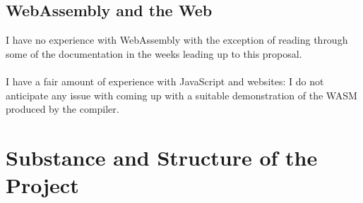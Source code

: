 	\subsection*{WebAssembly and the Web}
	I have no experience with WebAssembly with the exception of reading through some of the documentation in the weeks leading up to this proposal.
	\\\\
	I have a fair amount of experience with JavaScript and websites: I do not anticipate any issue with coming up with a suitable demonstration of the WASM produced by the compiler.
	
	
	\section*{Substance and Structure of the Project}
	
	
	

